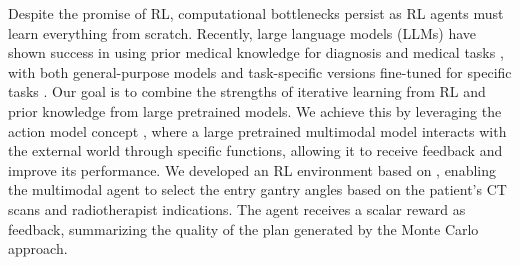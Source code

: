 Despite the promise of RL, computational bottlenecks persist as RL agents must learn everything from scratch. Recently, large language models (LLMs) have shown success in using prior medical knowledge for diagnosis and medical tasks \cite{llm_diagnosis, llm_medicine_application, llm_medicine_review}, with both general-purpose models and task-specific versions fine-tuned for specific tasks \cite{med-llama, med-sam, yagnik2024medlm}. Our goal is to combine the strengths of iterative learning from RL and prior knowledge from large pretrained models. We achieve this by leveraging the action model concept \cite{action_models}, where a large pretrained multimodal model interacts with the external world through specific functions, allowing it to receive feedback and improve its performance. We developed an RL environment based on \cite{matrad}, enabling the multimodal agent to select the entry gantry angles based on the patient's CT scans and radiotherapist indications. The agent receives a scalar reward as feedback, summarizing the quality of the plan generated by the Monte Carlo approach.

\vspace{-2mm}
